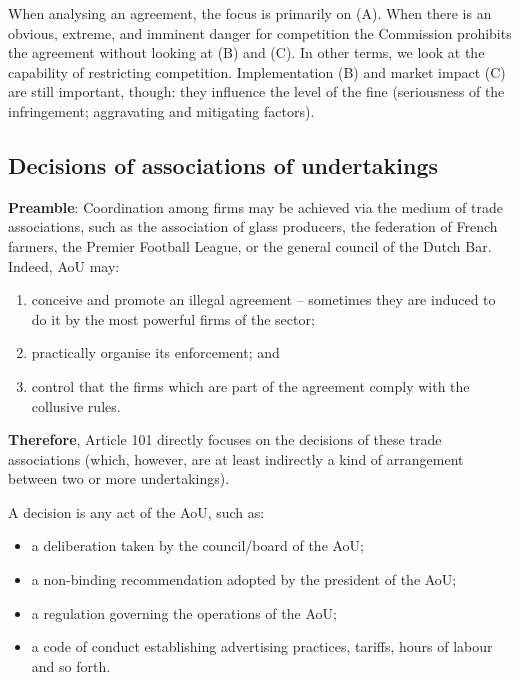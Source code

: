             When analysing an agreement, the focus is primarily on (A). When there is an obvious, extreme, and imminent danger for competition the Commission prohibits the agreement without looking at (B) and (C). In other terms, we look at the capability of restricting competition. Implementation (B) and market impact (C) are still important, though: they influence the level of the fine (seriousness of the infringement; aggravating and mitigating factors).

        \subsection{Decisions of associations of undertakings}

            \textbf{Preamble}: Coordination among firms may be achieved via the medium of trade associations, such as the association of glass producers, the federation of French farmers, the Premier Football League, or the general council of the Dutch Bar. Indeed, AoU may:

            \begin{enumerate}
                \item conceive and promote an illegal agreement – sometimes they are induced to do it by the most powerful firms of the sector;
                \item practically organise its enforcement; and
                \item control that the firms which are part of the agreement comply with the collusive rules.
            \end{enumerate}


            \textbf{Therefore}, Article 101 directly focuses on the decisions of these trade associations (which, however, are at least indirectly a kind of arrangement between two or more undertakings).

            A decision is any act of the AoU, such as: 

            \begin{itemize}
                \item a deliberation taken by the council/board of the AoU;
                \item a non-binding recommendation adopted by the president of the AoU;
                \item a regulation governing the operations of the AoU;
                \item a code of conduct establishing advertising practices, tariffs, hours of labour and so forth.
            \end{itemize}

